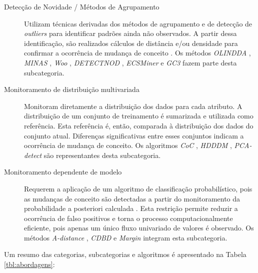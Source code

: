 \documentclass[msc, classic, a4paper]{ufbathesis}
\begin{document}
\begin{description}
    \item[Detecção de Novidade / Métodos de Agrupamento]
    Utilizam técnicas derivadas dos métodos de agrupamento e de detecção de \textit{outliers} para identificar padrões ainda não observados.
    A partir dessa identificação, são realizados cálculos de distância e/ou densidade para confirmar a ocorrência de mudança de conceito \cite{Ryu:Kantardzic:2012}.
    Os métodos
    \textit{OLINDDA} \cite{Spinosa:2007:OCA:1244002.1244107},
    \textit{MINAS} \cite{Faria:2013:NDA:2480362.2480515},
    \textit{Woo} \cite{Ryu:Kantardzic:2012},
    \textit{DETECTNOD} \cite{Hashemi:Hayat:DETECTNOD:2010},
    \textit{ECSMiner} \cite{Masud:2011:CNC:1978259.1978529} e
    \textit{GC3} \cite{Sethi2016b:GC3} fazem parte desta subcategoria.

    \item[Monitoramento de distribuição multivariada]
    Monitoram diretamente a distribuição dos dados para cada atributo.
    A distribuição de um conjunto de treinamento é sumarizada e utilizada como referência.
    Esta referência é, então, comparada à distribuição dos dados do conjunto atual.
    Diferenças significativas entre esses conjuntos indicam a ocorrência de mudança de conceito.
    Os algoritmos
    \textit{CoC} \cite{Lee:Magoules:CoC:2012},
    \textit{HDDDM} \cite{Ditzler:Polikar:HDDDM:2011},
    \textit{PCA-detect} \cite{Kuncheva:PCADetect:20085}
    são representantes desta subcategoria.

    \item[Monitoramento dependente de modelo]
    Requerem a aplicação de um algoritmo de classificação probabilístico,
    pois as mudanças de conceito são detectadas a partir do monitoramento da probabilidade a posteriori calculada \cite{Zliobaite:2010}.
    Esta restrição permite reduzir a ocorrência de falso positivos e torna o processo computacionalmente eficiente, pois apenas um único fluxo univariado de valores é observado.
    Os métodos
    \textit{A-distance} \cite{Dredze:ADistance:2010585},
    \textit{CDBD} \cite{Lindstrom:CDBD:2013} e
    \textit{Margin} \cite{Dries:Margin:2009} integram esta subcategoria.
\end{description}

Um resumo das categorias, subcategorias e algoritmos é apresentado na Tabela \ref{tbl:abordagens}:

\newpage
\end{document}
